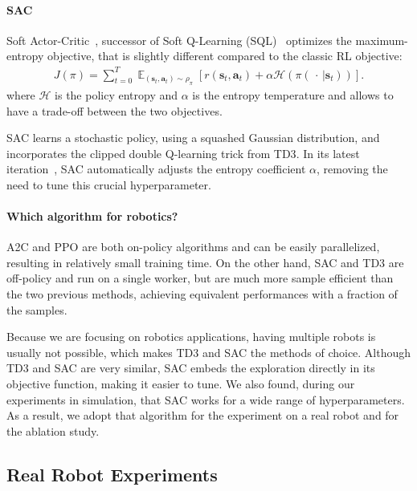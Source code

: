 \documentclass{article}
\newcommand{\E}[2]{\operatorname{\mathbb{E}}_{#1}\left[#2\right]}
\newcommand{\voidarg}{{\,\cdot\,}}
\newcommand{\state}{\mathbf{s}}
\newcommand{\reward}{r}
\newcommand{\action}{\mathbf{a}}
\newcommand{\at}{{\action_t}}
\newcommand{\st}{{\state_t}}
\newcommand{\policy}{\pi}
\newcommand{\entropy}{\mathcal{H}}
\newcommand{\ent}{\entropy}
\newcommand{\aac}{\textsc{A2C}\xspace}
\newcommand{\ppo}{\textsc{PPO}\xspace}
\newcommand{\sac}{\textsc{SAC}\xspace}
\newcommand{\tddd}{\textsc{TD3}\xspace}
\begin{document}
\paragraph{\sac}
Soft Actor-Critic~\citep{haarnoja2017reinforcement}, successor of Soft Q-Learning (SQL)~\citep{haarnoja2018soft} optimizes the maximum-entropy objective, that is slightly different compared to the classic RL objective:
\begin{align}
  \label{eq:maxent_objective}
  J(\policy)  = \sum_{t=0}^{T} \E{(\st, \at) \sim \rho_\policy}{\reward(\st,\at) + \alpha\ent(\policy(\voidarg|\st))}.
\end{align}
where $\ent$ is the policy entropy and $\alpha$ is the entropy temperature and allows to have a trade-off between the two objectives.

\sac learns a stochastic policy, using a squashed Gaussian distribution, and incorporates the clipped double Q-learning trick from \tddd.
In its latest iteration~\citep{haarnoja2018applications}, \sac automatically adjusts the entropy coefficient $\alpha$, removing the need to tune this crucial hyperparameter.

\paragraph{Which algorithm for robotics?}

\aac and \ppo are both on-policy algorithms and can be easily parallelized, resulting in relatively small training time.
On the other hand, \sac and \tddd are off-policy and run on a single worker, but are much more sample efficient than the two previous methods, achieving equivalent performances with a fraction of the samples.

Because we are focusing on robotics applications, having multiple robots is usually not possible, which makes \tddd and \sac the methods of choice. Although \tddd and \sac are very similar, \sac embeds the exploration directly in its objective function, making it easier to tune. We also found, during our experiments in simulation, that \sac works for a wide range of hyperparameters. As a result, we adopt that algorithm for the experiment on a real robot and for the ablation study.

\subsection{Real Robot Experiments}
\end{document}
